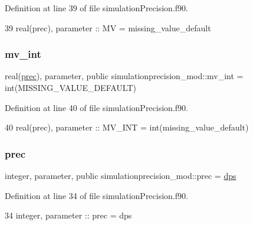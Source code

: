 Definition at line 39 of file simulation\+Precision.\+f90.


\begin{DoxyCode}
39     \textcolor{keywordtype}{real(prec)}, \textcolor{keywordtype}{parameter} :: MV     = missing\_value\_default
\end{DoxyCode}
\mbox{\label{namespacesimulationprecision__mod_a8d1d7d124b73efb89060c2d696b87bea}} 
\subsubsection{\texorpdfstring{mv\+\_\+int}{mv\_int}}
{\footnotesize\ttfamily real(\mbox{\hyperlink{namespacesimulationprecision__mod_a361ca48174e0dc2228c07f25fa5396ec}{prec}}), parameter, public simulationprecision\+\_\+mod\+::mv\+\_\+int = int(M\+I\+S\+S\+I\+N\+G\+\_\+\+V\+A\+L\+U\+E\+\_\+\+D\+E\+F\+A\+U\+LT)}



Definition at line 40 of file simulation\+Precision.\+f90.


\begin{DoxyCode}
40     \textcolor{keywordtype}{real(prec)}, \textcolor{keywordtype}{parameter} :: MV\_INT = int(missing\_value\_default)
\end{DoxyCode}
\mbox{\label{namespacesimulationprecision__mod_a361ca48174e0dc2228c07f25fa5396ec}} 
\subsubsection{\texorpdfstring{prec}{prec}}
{\footnotesize\ttfamily integer, parameter, public simulationprecision\+\_\+mod\+::prec = \mbox{\hyperlink{namespacesimulationprecision__mod_a1993497bc3b1b9925d3e409fe8891e8c}{dps}}}



Definition at line 34 of file simulation\+Precision.\+f90.


\begin{DoxyCode}
34     \textcolor{keywordtype}{integer},  \textcolor{keywordtype}{parameter} :: prec      = dps
\end{DoxyCode}
\mbox{\label{namespacesimulationprecision__mod_a2afc058035b6678d4ba773117f7c5202}} 
